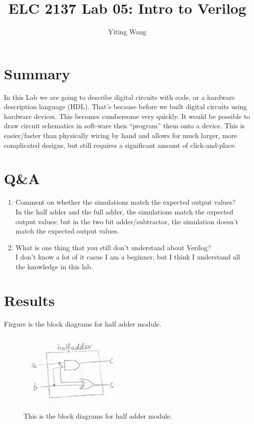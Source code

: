 \documentclass[11pt]{article}
\begin{document}
\title{ELC 2137 Lab 05: Intro to Verilog}
\author{Yiting Wang}

\maketitle


\section*{Summary}

In this Lab we are going to describe digital circuits with code,  or a  hardware description language  (HDL). That's because before we built digital circuits using hardware devices.  This becomes cumbersome very quickly.  It would be possible to draw circuit schematics in soft-ware then “program” them onto a device.  This is easier/faster than physically wiring by hand and allows for much larger, more complicated designs, but still requires a significant amount of click-and-place. \\



\section*{Q\&A}

\begin{enumerate}
	\item Comment on whether the simulations match the expected output values? \\
	In the half adder and the full adder, the simulations match the expected output values; but in the two bit adder/subtractor, the simulation doesn't match the expected output values. \\
	\item What is one thing that you still don’t understand about Verilog? \\
	I don't know a lot of it casue I am a beginner, but I think I understand all the knowledge in this lab. \\
\end{enumerate}



\section*{Results}

Firgure is the block diagrams for half adder module. \\
\begin{figure}[ht]\centering    
	\includegraphics[width=0.5\textwidth]{halfadder}    
	\caption{This is the block diagrams for half adder module.}    
	\label{fig:halfadder}
\end{figure}
\end{document}
